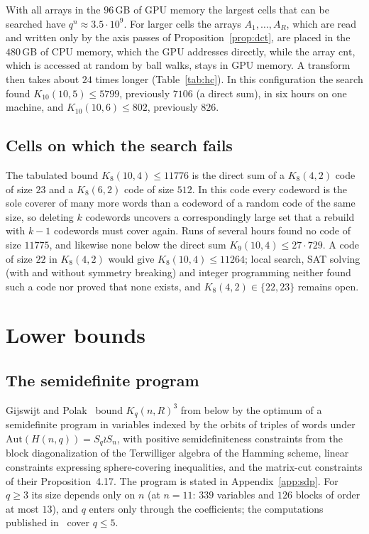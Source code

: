 \documentclass[11pt]{amsart}
\newcommand{\Kq}[3]{K_{#1}(#2,#3)}
\begin{document}
With all arrays in the $96$\,GB of GPU memory the largest cells that can
be searched have $q^n\approx 3.5\cdot 10^9$. For larger cells the arrays
$A_1,\dots,A_R$, which are read and written only by the axis passes of
Proposition~\ref{prop:dct}, are placed in the $480$\,GB of CPU memory,
which the GPU addresses directly, while the array $\mathrm{cnt}$, which is
accessed at random by ball walks, stays in GPU memory. A transform then
takes about $24$ times longer (Table~\ref{tab:hc}). In this configuration
the search found $\Kq{10}{10}{5}\le 5799$, previously $7106$ (a direct
sum), in six hours on one machine, and $\Kq{10}{10}{6}\le 802$, previously
$826$.

\subsection{Cells on which the search fails}\label{sec:lns:fail}

The tabulated bound $\Kq{8}{10}{4}\le 11776$ is the direct sum of a
$\Kq{8}{4}{2}$ code of size $23$ and a $\Kq{8}{6}{2}$ code of size $512$.
In this code every codeword is the sole coverer of many more words than a
codeword of a random code of the same size, so deleting $k$ codewords
uncovers a correspondingly large set that a rebuild with $k-1$ codewords
must cover again. Runs of several hours found no code of size $11775$, and
likewise none below the direct sum $\Kq{9}{10}{4}\le 27\cdot 729$. A code
of size $22$ in $\Kq{8}{4}{2}$ would give $\Kq{8}{10}{4}\le 11264$; local
search, SAT solving (with and without symmetry breaking) and integer
programming neither found such a code nor proved that none exists, and
$\Kq{8}{4}{2}\in\{22,23\}$ remains open.

\section{Lower bounds}\label{sec:lb}

\subsection{The semidefinite program}

Gijswijt and Polak~\cite[Theorem~4.18]{GijswijtPolak} bound $K_q(n,R)^3$
from below by the optimum of a semidefinite program in variables indexed
by the orbits of triples of words under $\mathrm{Aut}(H(n,q))=S_q\wr S_n$,
with positive semidefiniteness constraints from the block diagonalization
of the Terwilliger algebra of the Hamming scheme, linear constraints
expressing sphere-covering inequalities, and the matrix-cut constraints of
their Proposition~4.17. The program is stated in Appendix~\ref{app:sdp}.
For $q\ge 3$ its size depends only on $n$ (at $n=11$: $339$ variables and
$126$ blocks of order at most $13$), and $q$ enters only through the
coefficients; the computations published in~\cite{GijswijtPolak} cover
$q\le 5$.
\end{document}
